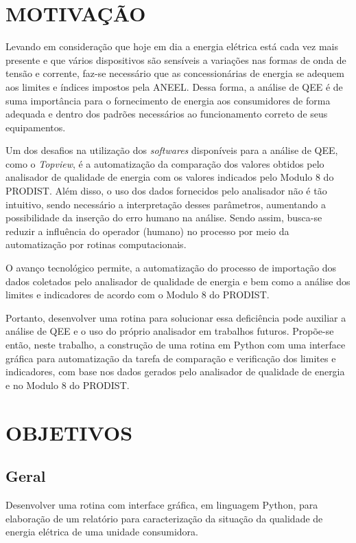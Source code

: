 \section{MOTIVAÇÃO}

Levando em consideração que hoje em dia a energia elétrica está cada vez mais presente e que vários dispositivos são sensíveis a variações nas formas de onda de tensão e corrente, faz-se necessário que as concessionárias de energia se adequem aos limites e índices impostos pela ANEEL. Dessa forma, a análise de QEE é de suma importância para o fornecimento de energia aos consumidores de forma adequada e dentro dos padrões necessários ao funcionamento correto de seus equipamentos.

Um dos desafios na utilização dos \textit{softwares} disponíveis para a análise de QEE, como o \textit{Topview}, é a automatização da comparação dos valores obtidos pelo analisador de qualidade de energia com os valores indicados pelo Modulo 8 do PRODIST. Além disso, o uso dos dados fornecidos pelo analisador não é tão intuitivo, sendo necessário a interpretação desses parâmetros, aumentando a possibilidade da inserção do erro humano na análise. Sendo assim, busca-se reduzir a influência do operador (humano) no processo por meio da automatização por rotinas computacionais.

O avanço tecnológico permite, a automatização do processo de importação dos dados coletados pelo analisador de qualidade de energia e bem como a análise dos limites e indicadores de acordo com o Modulo 8 do PRODIST.

Portanto, desenvolver uma rotina para solucionar essa deficiência pode auxiliar a análise de QEE e o uso do próprio analisador em trabalhos futuros. Propõe-se então, neste trabalho, a construção de uma rotina em Python com uma interface gráfica para automatização da tarefa de comparação e verificação dos limites e indicadores, com base nos dados gerados pelo analisador de qualidade de energia e no Modulo 8 do PRODIST.

\section{OBJETIVOS}

\subsection{Geral}

Desenvolver uma rotina com interface gráfica, em linguagem Python, para elaboração de um relatório para caracterização da situação da qualidade de energia elétrica de uma unidade consumidora.

